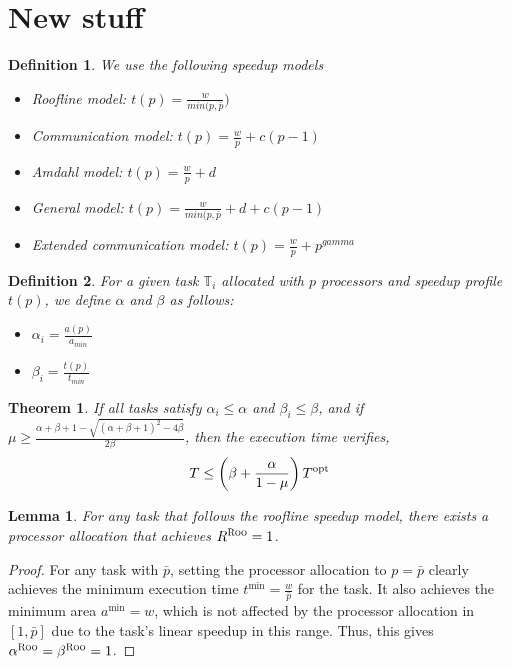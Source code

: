 \documentclass{article}
\newtheorem{lemma}{Lemma}
\newtheorem{theorem}{Theorem}
\newtheorem{definition}{Definition}
\newcommand\task{\mathbb{T}}
\newcommand\opt{\textnormal{opt}\xspace}
\newcommand\ROO{\textsc{Roo}\xspace}
\begin{document}
\section{New stuff}

\begin{definition}
We use the following speedup models
\begin{itemize}
\item Roofline model: $t(p)=\frac{w}{min(p,\bar{p}})$
\item Communication model: $t(p)=\frac{w}{p}+c(p-1)$
\item Amdahl model: $t(p)=\frac{w}{p}+d$
\item General model: $t(p)=\frac{w}{min(p,\bar{p}}+d+c(p-1)$
\item Extended communication model: $t(p)=\frac{w}{p}+p^{gamma}$
\end{itemize}
\end{definition}

\begin{definition}
For a given task $\task_i$ allocated with $p$ processors and speedup profile $t(p)$, we define $\alpha$ and $\beta$ as follows:
\begin{itemize}
\item $\alpha_i=\frac{a(p)}{a_{min}}$
\item $\beta_i=\frac{t(p)}{t_{min}}$
\end{itemize}
\end{definition}


\begin{theorem}
If all tasks satisfy $\alpha_i \leq \alpha$ and $\beta_i \leq \beta$, and if $\mu \geq \frac{\alpha+\beta+1-\sqrt{(\alpha+\beta+1)^2-4\beta}}{2\beta}$, then the execution time verifies,
$$T \leq \left( \beta+\frac{\alpha}{1-\mu} \right) T^{\opt}$$
\end{theorem}




\begin{lemma}\label{lem.roofline}
For any task that follows the roofline speedup model, there exists a processor allocation that achieves $R^{\ROO}=1$.
\end{lemma}

\begin{proof}
For any task with $\bar{p}$, setting the processor allocation to $p = \bar{p}$ clearly achieves the minimum execution time $t^{\min} = \frac{w}{\bar{p}}$ for the task. It also achieves the minimum area $a^{\min} = w$, which is not affected by the processor allocation in $[1, \bar{p}]$ due to the task's linear speedup in this range.
Thus, this gives $\alpha^{\ROO} = \beta^{\ROO} = 1$.
\end{proof}
\end{document}

